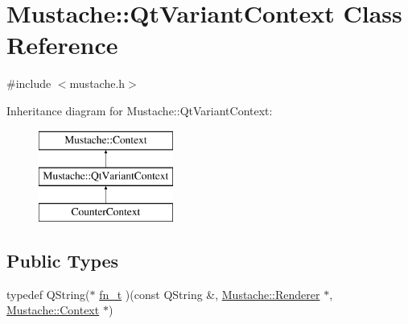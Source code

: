 \hypertarget{classMustache_1_1QtVariantContext}{\section{Mustache\+:\+:Qt\+Variant\+Context Class Reference}
\label{classMustache_1_1QtVariantContext}
}


{\ttfamily \#include $<$mustache.\+h$>$}

Inheritance diagram for Mustache\+:\+:Qt\+Variant\+Context\+:\begin{figure}[H]
\begin{center}
\leavevmode
\includegraphics[height=3.000000cm]{d5/d8b/classMustache_1_1QtVariantContext}
\end{center}
\end{figure}
\subsection*{Public Types}
\begin{DoxyCompactItemize}
\item 
typedef Q\+String($\ast$ \hyperlink{classMustache_1_1QtVariantContext_a3b258bcbe77d882a01c53abd1a9425d0}{fn\+\_\+t} )(const Q\+String \&, \hyperlink{classMustache_1_1Renderer}{Mustache\+::\+Renderer} $\ast$, \hyperlink{classMustache_1_1Context}{Mustache\+::\+Context} $\ast$)
\end{DoxyCompactItemize}
